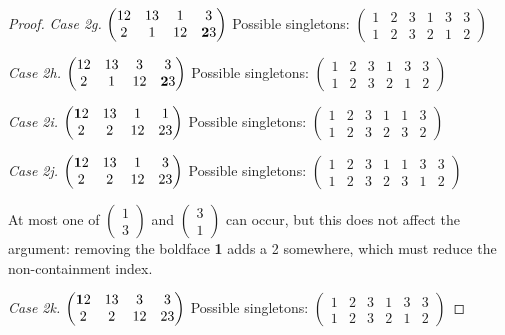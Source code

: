 \documentclass[11pt]{amsart}
\begin{document}
\begin{proof}
\textit{Case 2g.}
$\begin{pmatrix}
12 & 13 & 1 & 3\\
2 & 1 & 12 & {\bf 2}3 
\end{pmatrix}$
Possible singletons: 
$\begin{pmatrix}
1 & 2 & 3 & 1 & 3 & 3\\
1 & 2 & 3 & 2 & 1 & 2
\end{pmatrix}$

\textit{Case 2h.}
$\begin{pmatrix}
12 & 13 & 3 & 3\\
2 & 1 & 12 & {\bf 2}3 
\end{pmatrix}$
Possible singletons: 
$\begin{pmatrix}
1 & 2 & 3 & 1 & 3 & 3\\
1 & 2 & 3 & 2 & 1 & 2
\end{pmatrix}$

\textit{Case 2i.}
$\begin{pmatrix}
{\bf 1}2 & 13 & 1 & 1\\
2 & 2 & 12 & 23 
\end{pmatrix}$
Possible singletons: 
$\begin{pmatrix}
1 & 2 & 3 & 1 & 1 & 3\\
1 & 2 & 3 & 2 & 3 & 2
\end{pmatrix}$

\textit{Case 2j.}
$\begin{pmatrix}
{\bf 1}2 & 13 & 1 & 3\\
2 & 2 & 12 & 23 
\end{pmatrix}$
Possible singletons: 
$\begin{pmatrix}
1 & 2 & 3 & 1 & 1 & 3 & 3\\
1 & 2 & 3 & 2 & 3 & 1 & 2
\end{pmatrix}$

At most one of 
$\begin{pmatrix} 1\\3\end{pmatrix}$
and
$\begin{pmatrix} 3\\1\end{pmatrix}$
can occur, but this does not affect the argument: removing the boldface {\bf 1} adds a 2 somewhere, which must reduce the non-containment index.

\textit{Case 2k.}
$\begin{pmatrix}
{\bf 1}2 & 13 & 3 & 3\\
2 & 2 & 12 & 23 
\end{pmatrix}$
Possible singletons: 
$\begin{pmatrix}
1 & 2 & 3 & 1 & 3 & 3\\
1 & 2 & 3 & 2 & 1 & 2
\end{pmatrix}$


\end{proof}
\end{document}

